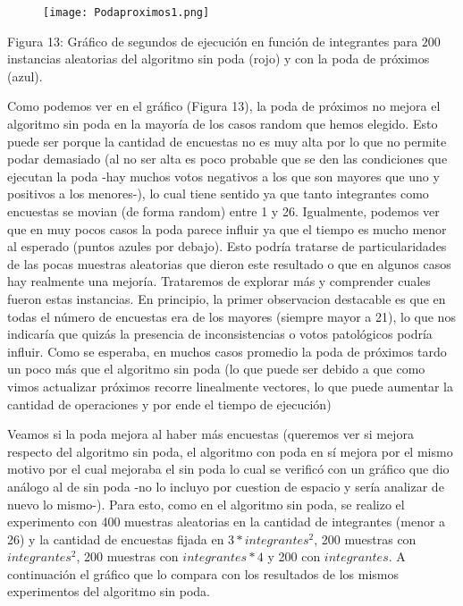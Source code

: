 \documentclass[A4paper,oneside,fleqn,10pt]{article}
\theoremstyle{definition}
\begin{document}
\begin{figure}[!ht]
  \texttt{[image: Podaproximos1.png]}
    \label{fig:boat13}
\end{figure}


\scriptsize

      Figura 13: Gráfico de segundos de ejecución en función de integrantes para $200$ instancias aleatorias del algoritmo sin poda (rojo) y con la poda de próximos (azul).
      
     \normalsize


Como podemos ver en el gráfico (Figura 13), la poda de próximos no mejora  el algoritmo sin poda en la mayoría de los casos random que hemos elegido. Esto puede ser porque la cantidad de encuestas no es muy alta por lo que no permite podar demasiado (al no ser alta es poco probable que se den las condiciones que ejecutan la poda -hay muchos votos negativos a los que son mayores que uno y positivos a los menores-), lo cual tiene sentido ya que tanto integrantes como encuestas se movian (de forma random) entre 1 y 26. Igualmente, podemos ver que en muy pocos casos la poda parece influir ya que el tiempo es mucho menor al esperado (puntos azules por debajo). Esto podría tratarse de particularidades de las pocas muestras aleatorias que dieron este resultado o que en algunos casos hay realmente una mejoría. Trataremos de explorar más y comprender cuales fueron estas instancias. En principio, la primer observacion destacable es que en todas el número de encuestas era de los mayores (siempre mayor a 21), lo que nos indicaría que quizás la presencia de inconsistencias o votos patológicos podría influir. Como se esperaba, en muchos casos promedio la poda de próximos tardo un poco más que el algoritmo sin poda (lo que puede ser debido a que como vimos actualizar próximos recorre linealmente vectores, lo que puede aumentar la cantidad de operaciones y por ende el tiempo de ejecución)


Veamos si la poda mejora al haber más encuestas (queremos ver si mejora respecto del algoritmo sin poda, el algoritmo con poda en sí mejora por el mismo motivo por el cual mejoraba el sin poda lo cual se verificó con un gráfico que dio análogo al de sin poda -no lo incluyo por cuestion de espacio y sería analizar de nuevo lo mismo-). Para esto, como en el algoritmo sin poda, se realizo el experimento con 400 muestras aleatorias en la cantidad de integrantes (menor a 26) y la cantidad de encuestas fijada en $3*integrantes^2$, 200 muestras con $integrantes^2$, 200 muestras con $integrantes*4$ y 200 con $integrantes$. A continuación el gráfico que lo compara con los resultados de los mismos experimentos del algoritmo sin poda.
\end{document}
